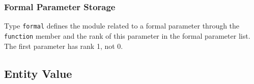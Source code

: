 \subsubsection{Formal Parameter Storage}
\label{subsubsection-formal}

{}
Type {\tt formal} defines the module related to a formal parameter
through the {\tt function} member and the rank of this parameter in the
formal parameter list. The first parameter has rank 1, not 0.

\iffalse
Le domaine \verb/formal/ indique le module dans lequel un parame`tre formel
est de'clare' gra^ce au sous-domaine \verb/function/, et le rang de ce
parame`tre dans la liste des parame`tres gra^ce au sous-domaine
\verb/offset/.
Le premier parame`tre a un rang de 1 et non de 0.
\fi


\subsection{Entity Value}
\label{subsection-value}

{}


